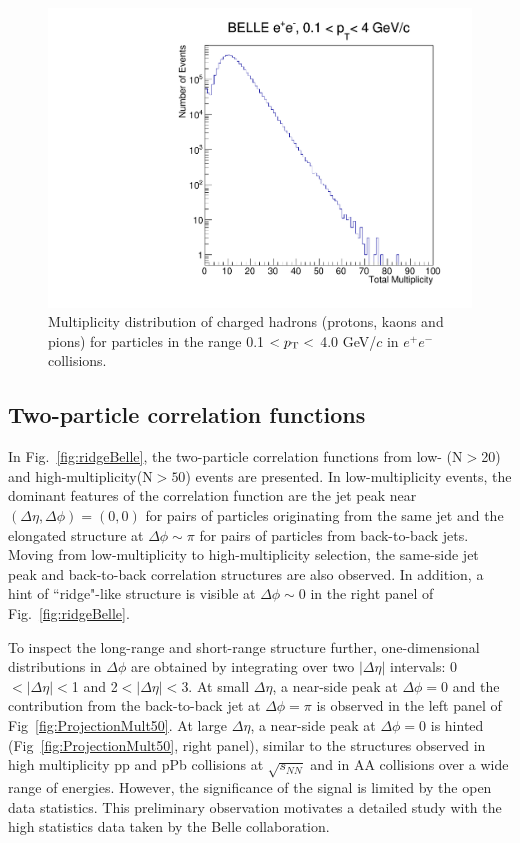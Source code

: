 \begin{figure}[!htb]
\begin{center}
\includegraphics[width=.45\textwidth]{figures/total_mult.pdf}
\caption{Multiplicity distribution of charged hadrons (protons, kaons and pions) for  particles in the range  0.1 $<p_{\rm T}<$ 4.0 GeV/$c$ in $e^{+}e^{-}$ collisions. }
\label{fig:multHadron} 
\end{center}
\end{figure}

\subsection{Two-particle correlation functions}


In Fig.~\ref{fig:ridgeBelle}, the two-particle correlation functions from low- (N$>$20) and high-multiplicity(N$>50$) events are presented. 
In low-multiplicity events, the dominant features of the correlation function are the jet peak near $(\Delta\eta,\Delta\phi)=(0,0)$ for pairs of particles originating from the same jet 
and the elongated structure at $\Delta\phi\sim\pi$ for pairs of particles from back-to-back jets. %
Moving from low-multiplicity to high-multiplicity selection, the same-side jet peak and back-to-back correlation structures are also observed. 
In addition, a hint of ``ridge"-like structure is visible at $\Delta\phi \sim$0 in the right panel of Fig.~\ref{fig:ridgeBelle}. 

To inspect the long-range and short-range structure further, one-dimensional distributions in $\Delta\phi$ are obtained by integrating over two $|\Delta\eta|$ intervals: 0$<|\Delta \eta|<$1 and 
2$<|\Delta \eta|<$3.  At small $\Delta\eta$, a near-side peak at $\Delta\phi=$0 and the contribution from the back-to-back jet at $\Delta\phi=\pi$ is observed in the left panel of Fig~\ref{fig:ProjectionMult50}. At large $\Delta\eta$, 
a near-side peak at $\Delta\phi=0$ is hinted (Fig~\ref{fig:ProjectionMult50}, right panel), similar to the structures observed in high multiplicity pp and pPb collisions at $\sqrt{s_{NN}}$ and in AA collisions over a wide range of energies. However, the significance of the signal is limited by the open data statistics. This preliminary observation motivates a detailed study with the high statistics data taken by the Belle collaboration. 

